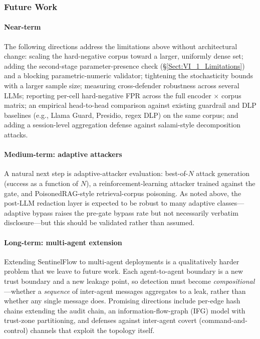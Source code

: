 \documentclass[journal]{IEEEtran}
\begin{document}
\subsubsection{Future Work}
\label{Sect:VI_2_FutureWork}

\paragraph{Near-term}
The following directions address the limitations above without architectural change: scaling the hard-negative corpus toward a larger, uniformly dense set; adding the second-stage parameter-presence check (\S\ref{Sect:VI_1_Limitations}) and a blocking parametric-numeric validator; tightening the stochasticity bounds with a larger sample size; measuring cross-defender robustness across several LLMs; reporting per-cell hard-negative FPR across the full encoder $\times$ corpus matrix; an empirical head-to-head comparison against existing guardrail and DLP baselines (e.g., Llama Guard, Presidio, regex DLP) on the same corpus; and adding a session-level aggregation defense against salami-style decomposition attacks.

\paragraph{Medium-term: adaptive attackers}
A natural next step is adaptive-attacker evaluation: best-of-$N$ attack generation (success as a function of $N$), a reinforcement-learning attacker trained against the gate, and PoisonedRAG-style retrieval-corpus poisoning. As noted above, the post-LLM redaction layer is expected to be robust to many adaptive classes---adaptive bypass raises the pre-gate bypass rate but not necessarily verbatim disclosure---but this should be validated rather than assumed.

\paragraph{Long-term: multi-agent extension}
Extending SentinelFlow to multi-agent deployments is a qualitatively harder problem that we leave to future work. Each agent-to-agent boundary is a new trust boundary and a new leakage point, so detection must become \emph{compositional}---whether a \emph{sequence} of inter-agent messages aggregates to a leak, rather than whether any single message does. Promising directions include per-edge hash chains extending the audit chain, an information-flow-graph (IFG) model with trust-zone partitioning, and defenses against inter-agent covert (command-and-control) channels that exploit the topology itself.
\end{document}
